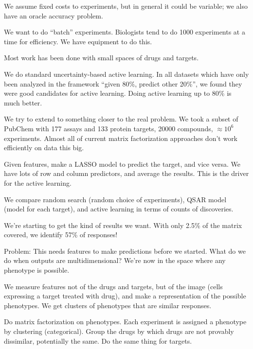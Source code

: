 We assume fixed costs to experiments, but in general it could be variable; we also have an oracle accuracy problem.

We want to do ``batch'' experiments. Biologists tend to do 1000 experiments at a time for efficiency. We have equipment to do this.

Most work has been done with small spaces of drugs and targets.

We do standard uncertainty-based active learning.
In all datasets which have only been analyzed in the framework ``given 80\%, predict other 20\%'', we found they were good candidates for active learning. Doing active learning up to 80\% is much better.


We try to extend to something closer to the real problem. We took a subset of PubChem with 177  assays and 133 protein targets, 20000 compounds, $\approx 10^6$ experiments. Almost all of current matrix factorization approaches don't work efficiently on data this big.

Given features, make a LASSO model to predict the target, and vice versa. We have lots of row and column predictors, and average the results. This is the driver for the active learning.

We compare random search (random choice of experiments), QSAR model (model for each target), and active learning in terms of counts of discoveries.

We're starting to get the kind of results we want. With only 2.5\% of the matrix covered, we identify 57\% of responses!

Problem: This needs features to make predictions before we started. What do we do when outputs are multidimensional?
We're now in the space where any phenotype is possible.

We measure features not of the drugs and targets, but of the image (cells expressing a target treated with drug), and make a representation of the possible phenotypes. We get clusters of phenotypes that are similar responses.


Do matrix factorization on phenotypes. Each experiment is assigned a phenotype by clustering (categorical). Group the drugs by which drugs are not provably dissimilar, potentially the same. Do the same thing for targets.


